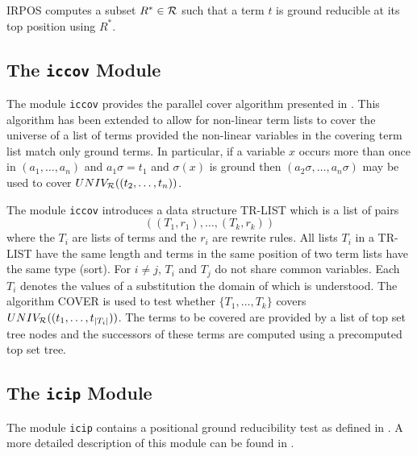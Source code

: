 IRPOS computes a subset \( R^* \in {\cal R} \) such that a term $t$ is 
ground reducible at its top position using $R^*$.

\subsection{The {\tt iccov} Module}

The module {\tt iccov} provides the parallel cover algorithm presented in
\cite{BuendgenKuechlin:89}.
This algorithm has been extended to allow for non-linear term lists
to cover the universe of a list of terms provided the non-linear variables
in the covering term list match only ground terms.
In particular, if a variable $x$ occurs more than once in $(a_1, \ldots, a_n)$ 
and \( a_1\sigma = t_1 \) and $\sigma(x)$ is ground then
\( (a_2\sigma, \ldots, a_n\sigma) \) may be used to cover
$UNIV_{\cal R}((t_2,\ldots,t_n))$.

The module {\tt iccov} introduces a data structure TR-LIST which is a list
of pairs
\[ ( (T_1,r_1), \ldots, (T_k,r_k)) \]
where the $T_i$ are lists of terms and the $r_i$ are rewrite rules.
All lists $T_i$ in a TR-LIST have the same length and terms in the same
position of two term lists have the same type (sort).
For \( i \neq j \), $T_i$ and $T_j$ do not share common variables.
Each $T_i$ denotes the values of a substitution the domain of which is
understood.
The algorithm COVER is used to test whether $\{T_1, \ldots, T_k\}$
covers $UNIV_{\cal R}((t_1,\ldots,t_{|T_i|}))$.
The terms to be covered are provided by a list  of top set tree nodes and the 
successors of these terms are computed using a precomputed top set tree.

\subsection{The {\tt icip} Module}

The module {\tt icip} contains a positional ground reducibility test as 
defined in \cite{Kuechlin:89}.
A more detailed description of this module can be found in
\cite{Buendgen:87}.

